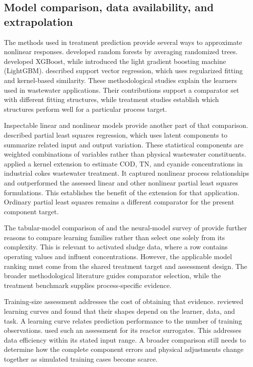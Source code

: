\subsection{Model comparison, data availability, and extrapolation}

The methods used in treatment prediction provide several ways to approximate nonlinear responses. \citet{Breiman2001} developed random forests by averaging randomized trees. \citet{ChenGuestrin2016} developed XGBoost, while \citet{Ke2017} introduced the light gradient boosting machine (LightGBM). \citet{SmolaScholkopf2004} described support vector regression, which uses regularized fitting and kernel-based similarity. These methodological studies explain the learners used in wastewater applications. Their contributions support a comparator set with different fitting structures, while treatment studies establish which structures perform well for a particular process target.

Inspectable linear and nonlinear models provide another part of that comparison. \citet{Wold2001} described partial least squares regression, which uses latent components to summarize related input and output variation. These statistical components are weighted combinations of variables rather than physical wastewater constituents. \citet{Woo2009} applied a kernel extension to estimate COD, TN, and cyanide concentrations in industrial cokes wastewater treatment. It captured nonlinear process relationships and outperformed the assessed linear and other nonlinear partial least squares formulations. This establishes the benefit of the extension for that application. Ordinary partial least squares remains a different comparator for the present component target.

The tabular-model comparison of \citet{ShwartzZiv2022} and the neural-model survey of \citet{Borisov2024} provide further reasons to compare learning families rather than select one solely from its complexity. This is relevant to activated sludge data, where a row contains operating values and influent concentrations. However, the applicable model ranking must come from the shared treatment target and assessment design. The broader methodological literature guides comparator selection, while the treatment benchmark supplies process-specific evidence.

Training-size assessment addresses the cost of obtaining that evidence. \citet{VieringLoog2023} reviewed learning curves and found that their shapes depend on the learner, data, and task. A learning curve relates prediction performance to the number of training observations. \citet{Selerio2026} used such an assessment for its reactor surrogates. This addresses data efficiency within its stated input range. A broader comparison still needs to determine how the complete component errors and physical adjustments change together as simulated training cases become scarce.

